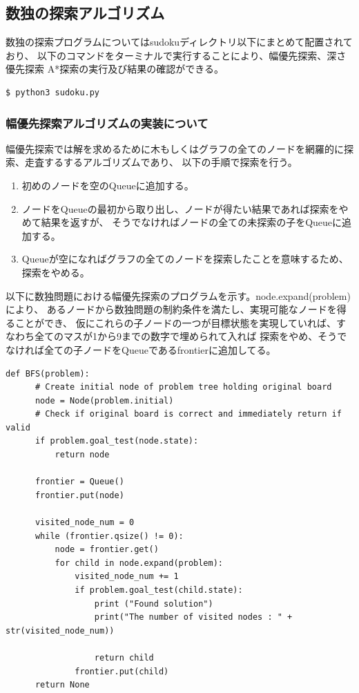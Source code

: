 \documentclass[uplatex]{jsarticle}
\begin{document}
\subsection{数独の探索アルゴリズム}
数独の探索プログラムについてはsudokuディレクトリ以下にまとめて配置されており、
以下のコマンドをターミナルで実行することにより、幅優先探索、深さ優先探索
A*探索の実行及び結果の確認ができる。
\begin{lstlisting}[basicstyle=\ttfamily\footnotesize, frame=single]
  $ python3 sudoku.py
\end{lstlisting}

\subsubsection{幅優先探索アルゴリズムの実装について}
幅優先探索では解を求めるために木もしくはグラフの全てのノードを網羅的に探索、走査するするアルゴリズムであり、
以下の手順で探索を行う。
\begin{enumerate}
  \item 初めのノードを空のQueueに追加する。
  \item ノードをQueueの最初から取り出し、ノードが得たい結果であれば探索をやめて結果を返すが、
  そうでなければノードの全ての未探索の子をQueueに追加する。
  \item Queueが空になればグラフの全てのノードを探索したことを意味するため、探索をやめる。
\end{enumerate}

以下に数独問題における幅優先探索のプログラムを示す。node.expand(problem)により、
あるノードから数独問題の制約条件を満たし、実現可能なノードを得ることができ、
仮にこれらの子ノードの一つが目標状態を実現していれば、すなわち全てのマスが1から9までの数字で埋められて入れば
探索をやめ、そうでなければ全ての子ノードをQueueであるfrontierに追加してる。

\begin{lstlisting}[basicstyle=\ttfamily\footnotesize, frame=single]
  def BFS(problem):
      # Create initial node of problem tree holding original board
      node = Node(problem.initial)
      # Check if original board is correct and immediately return if valid
      if problem.goal_test(node.state):
          return node

      frontier = Queue()
      frontier.put(node)

      visited_node_num = 0
      while (frontier.qsize() != 0):
          node = frontier.get()
          for child in node.expand(problem):
              visited_node_num += 1
              if problem.goal_test(child.state):
                  print ("Found solution")
                  print("The number of visited nodes : " + str(visited_node_num))

                  return child
              frontier.put(child)
      return None
\end{lstlisting}
\end{document}
